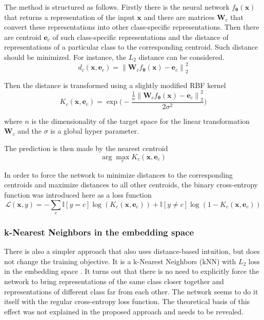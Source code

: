 \documentclass{article}
\newcommand{\norm}[1]{\left\lVert#1\right\rVert}
\begin{document}
The method is structured as follows. Firstly there is the neural network $f_{\boldsymbol{\theta}}(\boldsymbol{x})$ that returns a representation of the input $\boldsymbol{x}$ and there are matrices $\boldsymbol{W}_c$ that convert these representations into other class-specific representations.
Then there are centroid $\boldsymbol{e}_c$ of such class-specific representations and the distance of representations of a particular class to the corresponding centroid.
Such distance should be minimized.
For instance, the $L_2$ distance can be considered.
\begin{equation}
d_c(\boldsymbol{x}, \boldsymbol{e}_c) = \norm{\boldsymbol{W}_c f_{\boldsymbol{\theta}}(\boldsymbol{x}) - \boldsymbol{e}_c}^2_2
\end{equation}

Then the distance is transformed using a slightly modified RBF kernel
\begin{equation}
K_c(\boldsymbol{x}, \boldsymbol{e}_c) = \exp \Bigg( -\frac{\frac{1}{n} \norm{\boldsymbol{W}_c f_{\boldsymbol{\theta}}(\boldsymbol{x}) - \boldsymbol{e}_c}^2_2}{2 \sigma^2} \Bigg)
\end{equation}

where $n$ is the dimensionality of the target space for the linear transformation $\boldsymbol{W}_c$ and the $\sigma$ is a global hyper parameter.

The prediction is then made by the nearest centroid
\begin{equation}
\arg\max\limits_c K_c(\boldsymbol{x}, \boldsymbol{e}_c)
\end{equation}

In order to force the network to minimize distances to the corresponding centroids and maximize distances to all other centroids, the binary cross-entropy function was introduced here as a loss function
\begin{equation}
\mathcal{L}(\boldsymbol{x}, y) = -\sum\limits_c \mathbb{I}[y = c] \log(K_c(\boldsymbol{x}, \boldsymbol{e}_c)) + \mathbb{I}[y \neq c] \log(1 - K_c(\boldsymbol{x}, \boldsymbol{e}_c))
\end{equation}
\subsubsection{k-Nearest Neighbors in the embedding space}
There is also a simpler approach that also uses distance-based intuition, but does not change the training objective.
It is a k-Nearest Neighbors (kNN) with $L_2$ loss in the embedding space \cite{knn}.
It turns out that there is no need to explicitly force the network to bring representations of the same class closer together and representations of different class far from each other.
The network seems to do it itself with the regular cross-entropy loss function.
The theoretical basis of this effect was not explained in the proposed approach and needs to be revealed.
\end{document}
